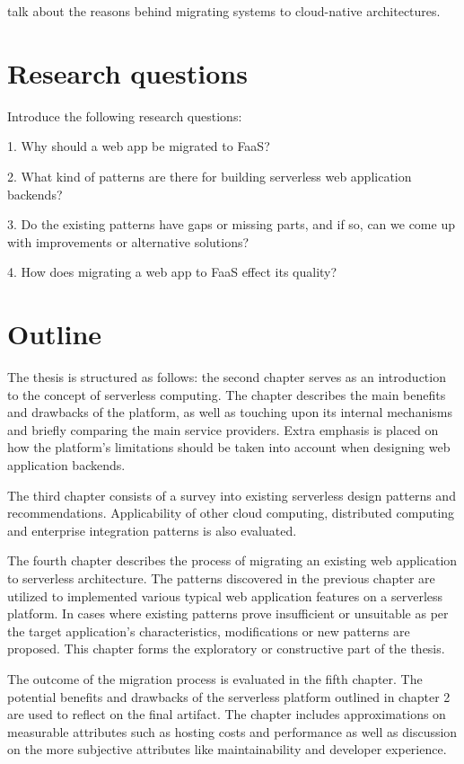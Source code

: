 \documentclass[utf8,english]{gradu3}
\begin{document}
\textcite{balalaie16migratingcloud} talk about the reasons behind migrating systems to cloud-native architectures.

\section{Research questions}

Introduce the following research questions:

1. Why should a web app be migrated to FaaS?

2. What kind of patterns are there for building serverless web application backends?

3. Do the existing patterns have gaps or missing parts, and if so, can we come up with improvements or alternative solutions?

4. How does migrating a web app to FaaS effect its quality?

\section{Outline}

The thesis is structured as follows: the second chapter serves as an introduction to the concept of serverless computing. The chapter describes the main benefits and drawbacks of the platform, as well as touching upon its internal mechanisms and briefly comparing the main service providers. Extra emphasis is placed on how the platform's limitations should be taken into account when designing web application backends.

The third chapter consists of a survey into existing serverless design patterns and recommendations. Applicability of other cloud computing, distributed computing and enterprise integration patterns is also evaluated.

The fourth chapter describes the process of migrating an existing web application to serverless architecture. The patterns discovered in the previous chapter are utilized to implemented various typical web application features on a serverless platform. In cases where existing patterns prove insufficient or unsuitable as per the target application's characteristics, modifications or new patterns are proposed. This chapter forms the exploratory or constructive part of the thesis.

The outcome of the migration process is evaluated in the fifth chapter. The potential benefits and drawbacks of the serverless platform outlined in chapter 2 are used to reflect on the final artifact. The chapter includes approximations on measurable attributes such as hosting costs and performance as well as discussion on the more subjective attributes like maintainability and developer experience.
\end{document}
